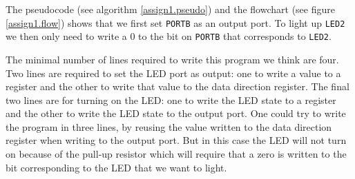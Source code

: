 The pseudocode (see algorithm \ref{assign1.pseudo}) and the flowchart (see figure \ref{assign1.flow}) shows that we first set \texttt{PORTB} as an output port. To light up \texttt{LED2} we then only need to write a 0 to the bit on \texttt{PORTB} that corresponds to \texttt{LED2}. 

The minimal number of lines required to write this program we think are four. Two lines are required to set the LED port as output: one to write a value to a register and the other to write that value to the data direction register. The final two lines are for turning on the LED: one to write the LED state to a register and the other to write the LED state to the output port. One could try to write the program in three lines, by reusing the value written to the data direction register when writing to the output port. But in this case the LED will not turn on because of the pull-up resistor which will require that a zero is written to the bit corresponding to the LED that we want to light.

